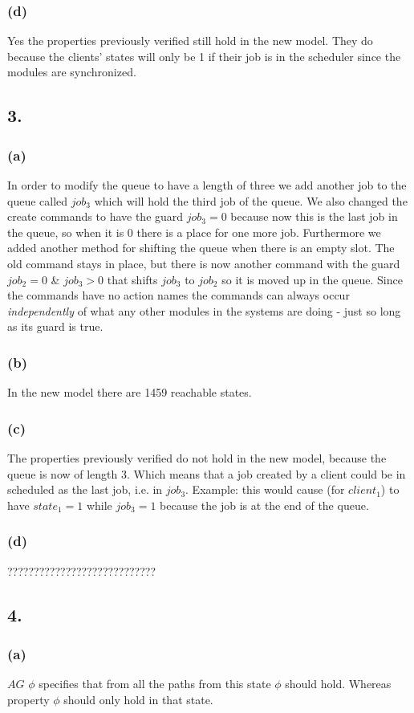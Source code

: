 \documentclass[12pt]{report}
\begin{document}
\subsubsection*{(d)}
Yes the properties previously verified still hold in the new model. They do because the clients' states will only be 1 if their job is in the scheduler since the modules are synchronized.
\subsection*{3.}
\subsubsection*{(a)}
In order to modify the queue to have a length of three we add another job to the queue called $job_3$ which will hold the third job of the queue. We also changed the create commands to have the guard $job_3 = 0$ because now this is the last job in the queue, so when it is 0 there is a place for one more job. Furthermore we added another method for shifting the queue when there is an empty slot. The old command stays in place, but there is now another command with the guard $job_2=0$ \& $job_3>0$ that shifts $job_3$ to $job_2$ so it is moved up in the queue. Since the commands have no action names the commands can always occur \emph{independently} of what any other modules in the systems are doing - just so long as its guard is true.
\subsubsection*{(b)}
In the new model there are 1459 reachable states.
\subsubsection*{(c)}
The properties previously verified do not hold in the new model, because the queue is now of length 3. Which means that a job created by a client could be in scheduled as the last job, i.e. in $job_3$. Example: this would cause (for $client_1$) to have $state_1 = 1$ while $job_3=1$ because the job is at the end of the queue.
\subsubsection*{(d)}
????????????????????????????
\subsection*{4.}
\subsubsection*{(a)}
$AG$ $\phi$ specifies that from all the paths from this state $\phi$ should hold. Whereas property $\phi$ should only hold in that state.
\end{document}
